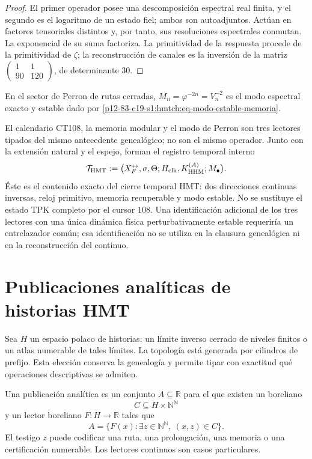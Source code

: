 \begin{proof}
El primer operador posee una descomposición espectral real finita, y el
segundo es el logaritmo de un estado fiel; ambos son autoadjuntos. Actúan en
factores tensoriales distintos y, por tanto, sus resoluciones espectrales
conmutan. La exponencial de su suma factoriza. La primitividad de la respuesta
procede de la primitividad de \(\zeta\); la reconstrucción de canales es la
inversión de la matriz
\(\left(\begin{smallmatrix}1&1\\90&120\end{smallmatrix}\right)\), de
determinante \(30\).
\end{proof}

\begin{corollary}
\label{p12-83-c19-s1:hmtch:cor-modo-estable-memoria}
En el sector de Perron de rutas cerradas,
\(M_n=\varphi^{-2n}=V_n^{-2}\) es el modo espectral exacto y estable dado
por \eqref{p12-83-c19-s1:hmtch:eq-modo-estable-memoria}.
\end{corollary}

El calendario CT108, la memoria modular y el modo de Perron son tres lectores
tipados del mismo antecedente genealógico; no son el mismo operador. Junto con
la extensión natural y el espejo, forman el registro temporal interno
\[
 \mathcal T_{\rm HMT}
 :=\bigl(X_F^{\leftrightarrow},\sigma,\Theta;
 H_{\rm clk},K_{\rm HHM}^{(A)};M_\bullet\bigr).
\]
Éste es el contenido exacto del cierre temporal HMT: dos direcciones
continuas inversas, reloj primitivo, memoria recuperable y modo estable. No
se sustituye el estado TPK completo por el cursor \(108\). Una identificación
adicional de los tres lectores con una única dinámica física perturbativamente
estable requeriría un entrelazador común; esa identificación no se utiliza en
la clausura genealógica ni en la reconstrucción del continuo.

\section{Publicaciones analíticas de historias HMT}

Sea \(H\) un espacio polaco de historias: un límite inverso cerrado de
niveles finitos o un atlas numerable de tales límites. La topología está
generada por cilindros de prefijo. Esta elección conserva la genealogía y
permite tipar con exactitud qué operaciones descriptivas se admiten.

\begin{definition}
\label{p12-83-c19-s1:hmtch:def-publicacion-analitica}
Una publicación analítica es un conjunto \(A\subseteq\mathbb R\) para el
que existen un boreliano
\[
 C\subseteq H\times\mathbb N^{\mathbb N}
\]
y un lector boreliano \(F:H\to\mathbb R\) tales que
\[
 A=\{F(x):\exists z\in\mathbb N^{\mathbb N},\ (x,z)\in C\}.
\]
El testigo \(z\) puede codificar una ruta, una prolongación, una memoria o
una certificación numerable. Los lectores continuos son casos particulares.
\end{definition}

